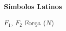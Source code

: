 \begin{simbolos}
	\item \textbf{Símbolos Latinos}
	  \item[$F_1$, $F_2$] Força ($N$)

    \begin{comment}
	  \item[$C_H$] Coeficiente de altura de carga (-)
	  \item[$C_Q$] Coeficiente de vazão (-)
	  \item[$C_P$] Coeficiente de potência (-)
	  \item[$D$] Dimensão linear característica, diâmetro ($m$)
	  \item[$g$] Aceleração gravitacional ($m\cdot s^{-2}$)
	  \item[$G$] Grau de reação (-)
	  \item[$h$] Altura da carga hidráulica no vertedor ($m$)
	  \item[$h_1, h_2, h_3$] Perda de carga ($m$)
	  \item[$h_v$] Pressão de vapor da água ($mca$)
	  \item[$H$] Altura Líquida de carga, altura de queda líquida ($m$)
	  \item[$H_d$] Queda disponível na entrada da turbina ($m$)
	  \item[$H_r$] Queda disponível na saída da turbina ($m$)
	  \item[$H_s$] Altura de sucção ($m$)
	  \item[$n$] Rotação da turbina (rpm)
	  \item[$n_s$] Rotação específica (rpm)
	  \item[$P_a$] Pressão atmosférica ($Pa$)
	  \item[$P_1$, $P_2$] Pressão ($Pa$)
	  \item[$P_e$] Potência de Eixo ($W$)
	  \item[$P_h$] Potência hidráulica ($W$)
	  \item[$Q$] Vazão volumétrica ($m^3\cdot s^{-1}$)
	  \item[$r$] Raio ($m$)
	  \item[$R_e$] Número de Reynols (-)
	  \item[$u$] Velocidade média do fluido ($m\cdot s^{-1}$)
	  \item[$v_1, v_2, v_3$] Velocidade média nas sessões 1, 2 e 3 ($m\cdot s^{-1}$) 
	  \item[$z_1$, $z_2$] Nível topográfico ($m$)

	  
	\item \textbf{Símbolos Gregos}
	  

\end{comment}
\end{simbolos}
